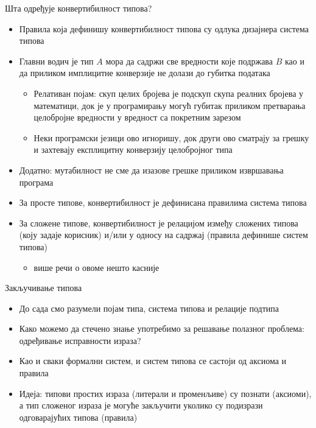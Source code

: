 \documentclass[xcolor=table]{beamer}
\begin{document}
    \begin{frame}[allowframebreaks]{Шта одређује конвертибилност типова?}
        \begin{itemize}
            \item Правила која дефинишу конвертибилност типова су одлука дизајнера система типова
            \item Главни водич је тип \begin{math}A\end{math} мора да садржи све вредности које подржава \begin{math}B\end{math} као и да приликом имплицитне конверзије не долази до губитка података
            \begin{itemize}
                \item Релативан појам: скуп целих бројева је подскуп скупа реалних бројева у математици, док је у програмирању могућ губитак приликом претварања целобројне вредности у вредност са покретним зарезом
                \item Неки програмски језици ово игноришу, док други ово сматрају за грешку и захтевају експлицитну конверзију целобројног типа
            \end{itemize}
            \item Додатно: мутабилност не сме да изазове грешке приликом извршавања програма
        \end{itemize}
        
        \framebreak
        
        \begin{itemize}
            \item За просте типове, конвертибилност је дефинисана правилима система типова
            \item За сложене типове, конвертибилност је релацијом између сложених типова (коју задаје корисник) и/или у односу на садржај (правила дефинише систем типова)
            \begin{itemize}
                \item више речи о овоме нешто касније
            \end{itemize}
        \end{itemize}
    \end{frame}

    \begin{frame}{Закључивање типова}
        \begin{itemize}
            \item До сада смо разумели појам типа, система типова и релације подтипа
            \item Како можемо да стечено знање употребимо за решавање полазног проблема: одређивање исправности израза?
            \item Као и сваки формални систем, и систем типова се састоји од аксиома и правила
            \item Идеја: типови простих израза (литерали и променљиве) су познати (аксиоми), а тип сложеног израза је могуће закључити уколико су подизрази одговарајућих типова (правила)
        \end{itemize}
    \end{frame}
\end{document}

